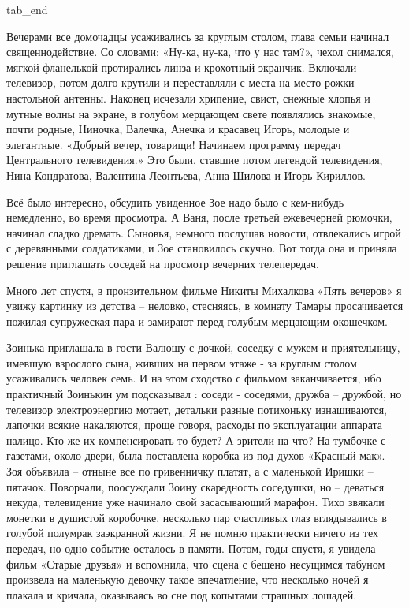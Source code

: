   tab_end
\fi

Вечерами все домочадцы усаживались за круглым столом, глава семьи начинал
священнодействие. Со словами: «Ну-ка, ну-ка, что у нас там?», чехол снимался,
мягкой фланелькой протирались линза и крохотный экранчик. Включали телевизор,
потом долго крутили и переставляли с места на место рожки настольной антенны.
Наконец исчезали хрипение, свист, снежные хлопья и мутные волны на экране, в
голубом мерцающем свете появлялись знакомые, почти родные, Ниночка, Валечка,
Анечка и красавец Игорь, молодые и элегантные. «Добрый вечер, товарищи!
Начинаем программу передач Центрального телевидения.» Это были, ставшие потом
легендой телевидения, Нина Кондратова, Валентина Леонтьева, Анна Шилова и Игорь
Кириллов.

Всё было интересно, обсудить увиденное Зое надо было с кем-нибудь немедленно,
во время просмотра. А Ваня, после третьей ежевечерней рюмочки, начинал сладко
дремать. Сыновья, немного послушав новости, отвлекались игрой с деревянными
солдатиками, и Зое становилось скучно. Вот тогда она и приняла решение
приглашать соседей на просмотр вечерних телепередач.

Много лет спустя, в пронзительном фильме Никиты Михалкова «Пять вечеров» я
увижу картинку из детства – неловко, стесняясь, в комнату Тамары просачивается
пожилая супружеская пара и замирают перед голубым мерцающим окошечком.

Зоинька приглашала в гости Валюшу с дочкой, соседку с мужем и приятельницу,
имевшую взрослого сына, живших на первом этаже - за круглым столом усаживались
человек семь. И на этом сходство с фильмом заканчивается, ибо практичный
Зоинькин ум подсказывал : соседи - соседями, дружба – дружбой, но телевизор
электроэнергию мотает, детальки разные потихоньку изнашиваются, лапочки всякие
накаляются, проще говоря, расходы по эксплуатации аппарата налицо. Кто же их
компенсировать-то будет? А зрители на что? На тумбочке с газетами, около двери,
была поставлена коробка из-под духов «Красный мак». Зоя объявила – отныне все
по гривенничку платят, а с маленькой Иришки – пятачок. Поворчали, поосуждали
Зоину скаредность соседушки, но – деваться некуда, телевидение уже начинало
свой засасывающий марафон. Тихо звякали монетки в душистой коробочке, несколько
пар счастливых глаз вглядывались в голубой полумрак заэкранной жизни. Я не
помню практически ничего из тех передач, но одно событие осталось в памяти.
Потом, годы спустя, я увидела фильм «Старые друзья» и вспомнила, что сцена с
бешено несущимся табуном произвела на маленькую девочку такое впечатление, что
несколько ночей я плакала и кричала, оказываясь во сне под копытами страшных
лошадей.

